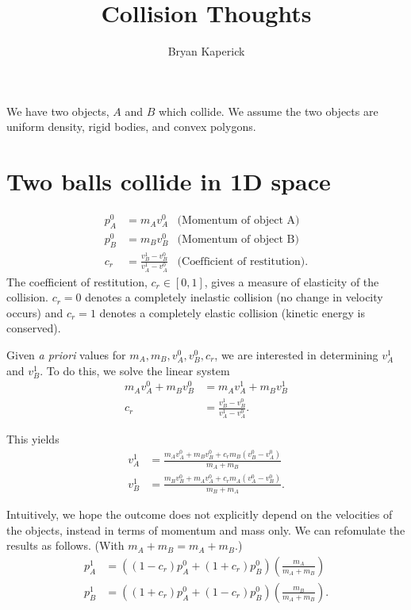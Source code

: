\documentclass[a4paper,11pt, oneside]{article}
\title{Collision Thoughts}
\author{Bryan Kaperick}
\newcommand{\mtot}{m_A + m_B}
\begin{document}
\maketitle\newpage

We have two objects, $A$ and $B$ which collide.  We assume the two objects are uniform density, rigid bodies, and convex polygons.

\section{Two balls collide in 1D space}
\begin{align*}
    p_A^{0} &= m_Av_A^0 & \text{(Momentum of object A)}\\
    p_B^{0} &= m_Bv_B^0 & \text{(Momentum of object B)}\\
    c_r &= \frac{v_B^1 - v_B^0}{v_A^1 - v_A^0}  &\text{(Coefficient of restitution)}.
\end{align*}
The coefficient of restitution, $c_r\in[0,1]$, gives a measure of elasticity of the collision. $c_r = 0$ denotes a completely inelastic collision (no change in velocity occurs) and $c_r = 1$ denotes a completely elastic collision (kinetic energy is conserved).

Given \emph{a priori} values for $m_A, m_B, v_A^0, v_B^0, c_r$, we are interested in determining $v_A^1$ and $v_B^1$.  To do this, we solve the linear system
\begin{align*}
    m_Av_A^0 + m_Bv_B^0 &= m_Av_A^1 + m_Bv_B^1\\
    c_r &= \frac{v_B^1 - v_B^0}{v_A^1 - v_A^0}.
\end{align*}

This yields
\begin{align*}
    v_A^1 &= \frac{m_Av_A^0 + m_Bv_B^0 + c_r m_B (v_B^0 - v_A^0)}{m_A + m_B}\\
    v_B^1 &= \frac{m_Bv_B^0 + m_Av_A^0 + c_r m_A (v_A^0 - v_B^0)}{m_B + m_A}.
\end{align*}

Intuitively, we hope the outcome does not explicitly depend on the velocities of the objects, instead in terms of momentum and mass only.  We can refomulate the results as follows.  (With $\mtot = m_A + m_B$.)
\begin{align*}
    p_A^1 &= \left((1-c_r)p_A^0 + (1+c_r)p_B^0\right)\left(\frac{m_A}{\mtot}\right)\\
    p_B^1 &= \left((1+c_r)p_A^0 + (1-c_r)p_B^0\right)\left(\frac{m_B}{\mtot}\right).
\end{align*}
\end{document}
